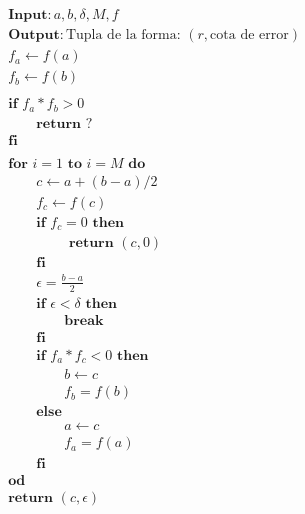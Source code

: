 \documentclass[12pt]{article}
\theoremstyle{definition}
\begin{document}
\begin{align*}
&\textbf{Input}: a, b, \delta, M, f\\  
&\textbf{Output}: \text{Tupla de la forma: } (r, \text{cota de error})\\
&f_a \leftarrow  f(a) \\ 
&f_b \leftarrow f(b) \\ 
&\qquad\\
&\textbf{if } f_a*f_b > 0 \\ 
&\qquad \textbf{return } ?\\ 
&\textbf{fi}\\
&\qquad\\
&\textbf{for } i = 1 \textbf{ to } i = M \textbf{ do } \\ 
&\qquad c \leftarrow a + (b-a) / 2 \\ 
&\qquad f_c \leftarrow f(c) \\ 
&\qquad \textbf{if } f_c = 0 \textbf{ then } \\ 
&\qquad\qquad \textbf{ return } (c, 0) \\ 
&\qquad\textbf{fi}\\
&\qquad \epsilon = \frac{b - a}{2}\\
&\qquad \textbf{if } \epsilon < \delta \textbf{ then } \\ 
& \qquad\qquad \textbf{break}\\
&\qquad\textbf{fi}\\
&\qquad \textbf{if } f_a*f_c < 0 \textbf{ then } \\ 
&\qquad \qquad b \leftarrow c \\ 
&\qquad\qquad f_b = f(b)\\
&\qquad\textbf{else } \\ 
&\qquad\qquad a \leftarrow c \\ 
&\qquad\qquad f_a = f(a)\\
&\qquad\textbf{fi} \\ 
&\textbf{od}\\
&\textbf{return } (c, \epsilon)
\end{align*}

\pagebreak 
\end{document}

